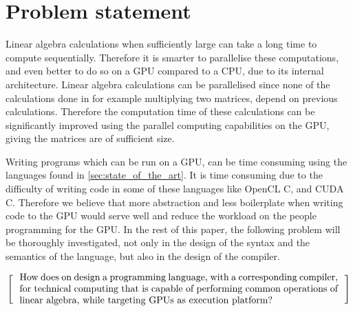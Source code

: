 \newpage
\section{Problem statement}

Linear algebra calculations when sufficiently large can take a long time to compute sequentially. 
Therefore it is smarter to parallelise these computations, and even better to do so on a GPU compared to a CPU, due to its internal architecture.
Linear algebra calculations can be parallelised since none of the calculations done in for example multiplying two matrices, depend on previous calculations.
Therefore the computation time of these calculations can be significantly improved using the parallel computing capabilities on the GPU, giving the matrices are of sufficient size.

Writing programs which can be run on a GPU, can be time consuming using the languages found in \ref{sec:state_of_the_art}.
It is time consuming due to the difficulty of writing code in some of these languages like OpenCL C, and CUDA C.
Therefore we believe that more abstraction and less boilerplate when writing code to the GPU would serve well and reduce the workload on the people programming for the GPU.
In the rest of this paper, the following problem will be thoroughly investigated, not only in the design of the syntax and the semantics of the language, but also in the design of the compiler.

\[
  \left[
  \begin{minipage}{\textwidth}
  \centering
  \begin{minipage}{0.96\textwidth}
  How does on design a programming language, with a corresponding compiler, for technical computing that is capable of performing common operations of linear algebra, while targeting GPUs as execution platform?
  
  



  \end{minipage}
  \end{minipage}
    \right]
\]